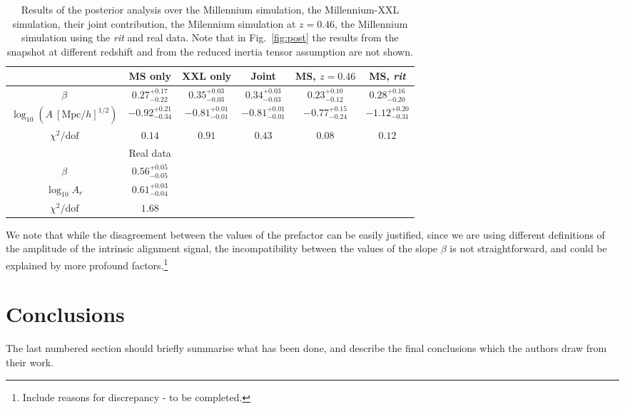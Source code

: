 \documentclass[a4paper,fleqn,usenatbib]{mnras}
\begin{document}
\begin{table*}
	\centering
	\caption{Results of the posterior analysis over the Millennium simulation, the Millennium-XXL simulation, their joint contribution, the Milennium simulation at $z = 0.46$, the Millennium simulation using the \textit{rit} and real data. Note that in Fig.~\ref{fig:post}\protect{} the results from the snapshot at different redshift and from the reduced inertia tensor assumption are not shown.}
	\label{tab:param}
	\begin{tabular}{c||ccccc} %
		\hline \hline
		\ & MS only & XXL only & Joint & MS, $z=0.46$ & MS, \textit{rit} \\
		\hline
		$\beta$					  & $0.27^{+0.17}_{-0.22}$   & $0.35^{+0.03}_{-0.03}$  & $0.34^{+0.03}_{-0.03}$ &  $0.23^{+0.10}_{-0.12}$ & $0.28^{+0.16}_{-0.20}$ \\
		$\log_{10} (A \ [\mbox{Mpc}/h]^{1/2})$ & $-0.92^{+0.21}_{-0.34}$ & $-0.81^{+0.01}_{-0.01}$ & $-0.81^{+0.01}_{-0.01}$&$-0.77^{+0.15}_{-0.24}$&  $-1.12^{+0.20}_{-0.31}$\\
		$\chi^2 / \mbox{dof}$			  & $0.14$                                 & $0.91$			 & $0.43$			    & $0.08$			      & $0.12$	 \\
		\hline \hline
		\ & Real data & \ & \ \\
		\hline
		$\beta$ & $0.56^{+0.05}_{-0.05}$ & &\\
		$\log_{10} A_r $ & $0.61^{+0.03}_{-0.04}$ & & & & \\
		$\chi^2 / \mbox{dof}$			  & $1.68$  & & & & \\
		\hline \hline 
		\end{tabular}
\end{table*}

We note that while the disagreement between the values of the prefactor can be easily justified, since we are using different definitions of the amplitude of the intrinsic alignment signal, the incompatibility between the values of the slope $\beta$ is not straightforward, and could be explained by more profound factors.\footnote{Include reasons for discrepancy - to be completed.}

\section{Conclusions}

The last numbered section should briefly summarise what has been done, and describe
the final conclusions which the authors draw from their work.
\end{document}
